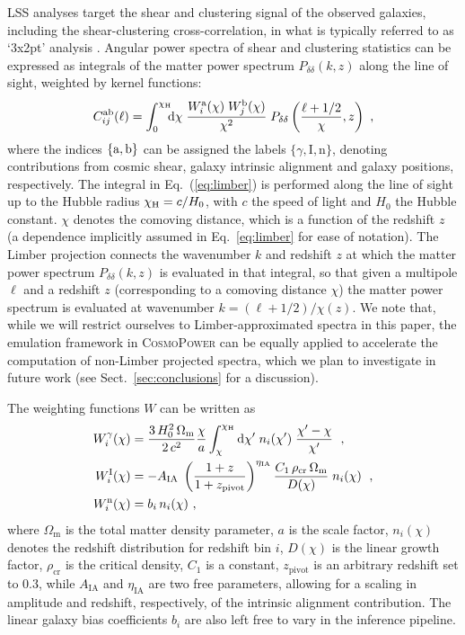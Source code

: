 \documentclass[fleqn,usenatbib]{mnras}
\begin{document}
LSS analyses target the shear and clustering signal of the observed galaxies, including the shear-clustering cross-correlation, in what is typically referred to as `3x2pt' analysis \citep{Joachimi10}. Angular power spectra of shear and clustering statistics can be expressed as integrals of the matter power spectrum $P_{\delta \delta}(k, z)$ along the line of sight, weighted by kernel functions:
\begin{align}\label{eq:limber}
C_{ij}^{\rm ab}(\ell) = \int^{\chi_{\rm H}}_0 \!\!\! \mathrm{d} \chi\;
\frac{W^{\rm a}_{i} (\chi)\; W^{\rm b}_{ j} (\chi)}{\chi^2}\; P_{\delta \delta} \left( \frac{\ell+1/2}{\chi}, z \right) \ ,
\end{align}
where the indices $\{ {\rm a,b} \}$ can be assigned the labels $\{\gamma, \mathrm{I}, \mathrm{n}\}$, denoting contributions from cosmic shear, galaxy intrinsic alignment and galaxy positions, respectively. The integral in Eq.~(\ref{eq:limber}) is performed along the line of sight up to the Hubble radius $\chi_{\rm{H}} = c/H_0$, with $c$ the speed of light and $H_0$ the Hubble constant. $\chi$ denotes the comoving distance, which is a function of the redshift $z$ (a dependence implicitly assumed in Eq.~\ref{eq:limber} for ease of notation). The Limber projection \citep{Kaiser92, LoVerde08} connects the wavenumber $k$ and redshift $z$ at which the matter power spectrum $P_{\delta \delta}(k, z)$ is evaluated in that integral, so that given a multipole $\ell$ and a redshift $z$ (corresponding to a comoving distance $\chi$) the matter power spectrum is evaluated at wavenumber $k = (\ell + 1/2) / \chi(z)$. We note that, while we will restrict ourselves to Limber-approximated spectra in this paper, the emulation framework in \textsc{CosmoPower} can be equally applied to accelerate the computation of non-Limber projected spectra, which we plan to investigate in future work (see Sect.~\ref{sec:conclusions} for a discussion).

The weighting functions $W$ can be written as 
\begin{align}\label{eq:kernels}
W^{\gamma}_{i} (\chi) &= \frac{3 \, H_0^2 \, \Omega_{\mathrm{m}}}{2\, c^2}
\frac{\chi}{a} \int_{\chi}^{\chi_{\mathrm{H}}} \mathrm{d} \chi'\; n_{i}(\chi')\; \frac{\chi' - \chi}{\chi'}\; \ , \\
W^{\rm I}_{i} (\chi) &= - A_{\rm IA}\; \left( \frac{1+z}{1+z_{\rm pivot}} \right)^{\eta_{\rm IA}}  \frac{C_1 \, \rho_{\rm cr} \, \Omega_{\rm m}}{D(\chi)}\; n_{i}(\chi)\; \ , \\
W^{\rm n}_{i} (\chi) &= b_i \, n_{i}(\chi) \ ,
\end{align}
where $\Omega_{\mathrm{m}}$ is the total matter density parameter, $a$ is the scale factor, $n_i(\chi)$ denotes the redshift distribution for redshift bin $i$, $D(\chi)$ is the linear growth factor, $\rho_{\mathrm{cr}}$ is the critical density, $C_1$ is a constant, $z_{\mathrm{pivot}}$ is an arbitrary redshift set to 0.3, while $A_{\mathrm{IA}}$ and $\eta_{\mathrm{IA}}$ are two free parameters, allowing for a scaling in amplitude and redshift, respectively, of the intrinsic alignment contribution. The linear galaxy bias coefficients $b_i$ are also left free to vary in the inference pipeline.
\end{document}
